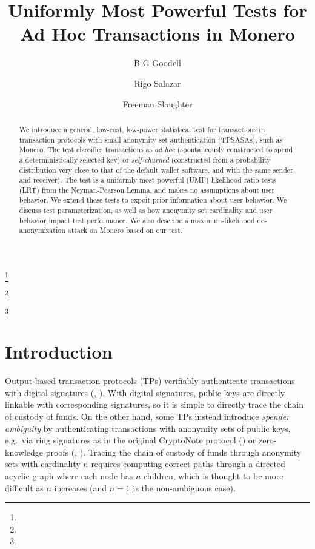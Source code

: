\documentclass{tran-l}
\theoremstyle{cor}
\theoremstyle{definition}
\theoremstyle{remark}
\theoremstyle{conjecture}
\numberwithin{equation}{section}
\begin{document}
\title{Uniformly Most Powerful Tests for \\ Ad Hoc Transactions in Monero}



\author{B G Goodell}
\address{Cypherstack}
\curraddr{}
\thanks{}

\author{Rigo Salazar}
\address{Cypherstack}
\curraddr{}
\thanks{}

\author{Freeman Slaughter}
\address{Cypherstack}
\thanks{}

\date{}

\dedicatory{}

\begin{abstract}
We introduce a general, low-cost, low-power statistical test for transactions in transaction protocols with small anonymity set authentication (TPSASAs), such as Monero.
The test classifies transactions as \textit{ad hoc} (spontaneously constructed to spend a deterministically selected key) or \textit{self-churned} (constructed from a probability distribution very close to that of the default wallet software, and with the same sender and receiver).
The test is a uniformly most powerful (UMP) likelihood ratio tests (LRT) from the Neyman-Pearson Lemma, and makes no assumptions about user behavior.
We extend these tests to expoit prior information about user behavior.
We discuss test parameterization, as well as how anonymity set cardinality and user behavior impact test performance.
We also describe a maximum-likelihood de-anonymization attack on Monero based on our test.
\end{abstract}

\maketitle

\section{Introduction}

Output-based transaction protocols (TPs) verifiably authenticate transactions with digital signatures (\cite{nakamoto2008bitcoin}, \cite{buterin2013ethereum}).
With digital signatures, public keys are directly linkable with corresponding signatures, so it is simple to directly trace the chain of custody of funds.
On the other hand, some TPs instead introduce \textit{spender ambiguity} by authenticating transactions with anonymity sets of public keys, e.g.\ via ring signatures as in the original CryptoNote protocol (\cite{van2013cryptonote}) or zero-knowledge proofs (\cite{hopwood2016zcash}, \cite{eagen2022zero}).
Tracing the chain of custody of funds through anonymity sets with cardinality $n$ requires computing correct paths through a directed acyclic graph where each node has $n$ children, which is thought to be more difficult as $n$ increases (and $n=1$ is the non-ambiguous case).
\end{document}
